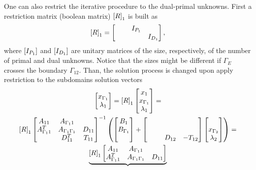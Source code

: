 One can also restrict the iterative procedure to the dual-primal unknowns. First a restriction matrix (boolean matrix) $\left[R\right]_1$ is built as
$$ \mat{R}_1 = \begin{bmatrix}
\phantom{I_{P_1}} & I_{P_1} & \\
& & I_{D_1}
\end{bmatrix},$$
\noindent where $\left[I_{P_1}\right]$ and $\left[I_{D_1}\right]$ are unitary matrices of the size, respectively, of the number of primal and dual unknowns. Notice that the sizes might be different if $\Gamma_E$ crosses the boundary $\Gamma_{12}$. Than, the solution process is changed upon apply restriction to the subdomains solution vectors
%
\begin{multline}
\label{eq:DDFETI1res}
\begin{bmatrix}
x_{\Gamma_1}\\
\lambda_{1}
\end{bmatrix} =
\left[R\right]_1
\begin{bmatrix}
x_{1}\\
x_{\Gamma_1}\\
\lambda_{1}
\end{bmatrix}
=\\
\left[R\right]_1
\begin{bmatrix}
A_{11} & A_{\Gamma_1 1} & \\
A_{\Gamma_1 1}^T & A_{\Gamma_1 \Gamma_1} & D_{11}\\
 & D_{11}^T  & T_{11}
\end{bmatrix}^{-1}
\left(
\begin{bmatrix}
B_{1}\\
B_{\Gamma_1}\\
\phantom{x}
\end{bmatrix}
+
\begin{bmatrix}
\phantom{-}\phantom{A} & \phantom{-}\phantom{A} & \phantom{A}\\
\phantom{A} & \phantom{A} & \phantom{A}\\
\phantom{A} & D_{12}  & -T_{12}
\end{bmatrix}
\begin{bmatrix}
\phantom{x}\\
x_{\Gamma_2}\\
\lambda_{2}
\end{bmatrix}
\right) = \\
\underbrace{
\left[R\right]_1
\begin{bmatrix}
A_{11} & A_{\Gamma_1 1} & \\
A_{\Gamma_1 1}^T & A_{\Gamma_1 \Gamma_1} & D_{11}\\

\end{bmatrix}}
\end{multline}

